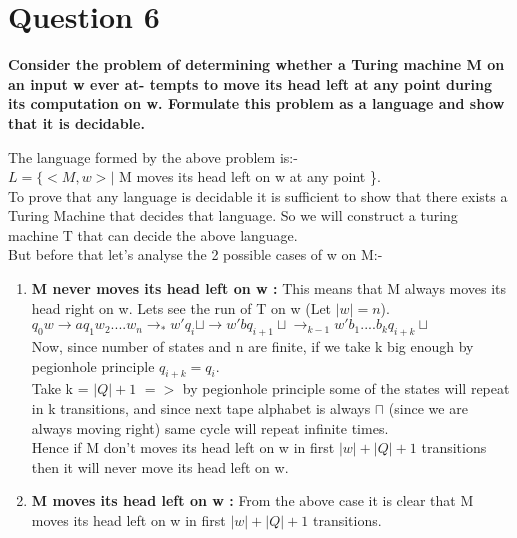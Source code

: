 \documentclass{article}
\begin{document}
\pagebreak


\section{Question 6}

\textbf{Consider the problem of determining whether a Turing machine M on an input w ever at-
tempts to move its head left at any point during its computation on w. Formulate this
problem as a language and show that it is decidable.\\}

The language formed by the above problem is:- \\
$L = \{ <M,w> |$ M moves its head left on w at any point \}.\\

To prove that any language is decidable it is sufficient to show that there exists a Turing Machine that 
decides that language. So we will construct a turing machine T that can decide the above language.\\
But before that let's analyse the 2 possible cases of w on M:-

\begin{enumerate}
    \item \textbf{M never moves its head left on w :}
    This means that M always moves its head right on w. Lets see the run of T on w (Let $|w| = n$).\\
    $q_0w \rightarrow aq_1w_2....w_n \rightarrow_* w'q_i \sqcup \rightarrow w' b q_{i+1} \sqcup \rightarrow_{k-1} w' b_1....b_k q_{i+k} \sqcup   $\\
    Now, since number of states and n are finite, if we take k big enough by pegionhole principle $q_{i+k} = q_i$.\\
    Take k = $|Q|+1$ $=>$ by pegionhole principle some of the states will repeat in k transitions, and since next tape alphabet 
    is always $\sqcap$ (since we are always moving right) same cycle will repeat infinite times.\\
    Hence if M don't moves its head left on w in first $|w| + |Q| + 1$ transitions then it will never move its head left on w.\\

    \item \textbf{M moves its head left on w :}
    From the above case it is clear that M moves its head left on w in first $|w| + |Q| + 1$ transitions.\\
    
\end{enumerate}
\end{document}
